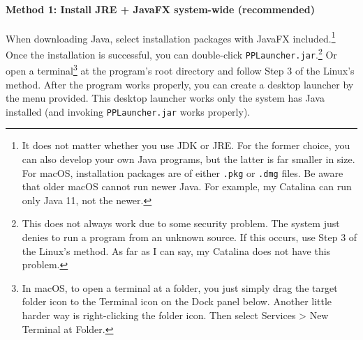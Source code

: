 \paragraph{Method 1: Install JRE + JavaFX system-wide (recommended)} When downloading Java, select installation packages with JavaFX included.\footnote{It does not matter whether you use JDK or JRE. For the former choice, you can also develop your own Java programs, but the latter is far smaller in size. For macOS, installation packages are of either \texttt{.pkg} or \texttt{.dmg} files. Be aware that older macOS cannot run newer Java. For example, my Catalina can run only Java 11, not the newer.} Once the installation is successful, you can double-click \texttt{PPLauncher.jar}.\footnote{This does not always work due to some security problem. The system just denies to run a program from an unknown source. If this occurs, use Step 3 of the Linux's method. As far as I can say, my Catalina does not have this problem.} Or open a terminal\footnote{In macOS, to open a terminal at a folder, you just simply drag the target folder icon to the Terminal icon on the Dock panel below. Another little harder way is right-clicking the folder icon. Then select Services > New Terminal at Folder.} at the program's root directory and follow Step 3 of the Linux's method. After the program works properly, you can create a desktop launcher by the menu provided. This desktop launcher works only the system has Java installed (and invoking \texttt{PPLauncher.jar} works properly).


